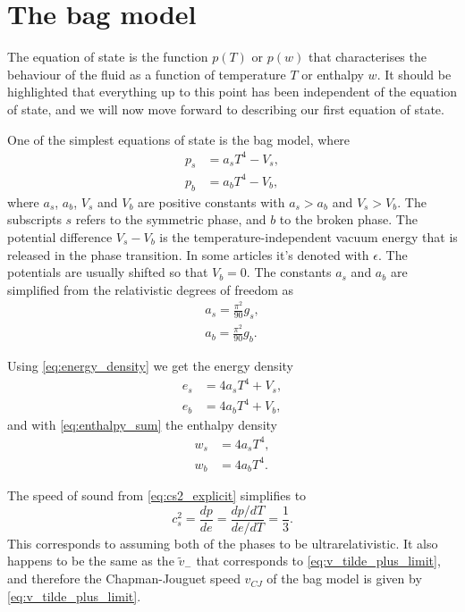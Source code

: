 \section{The bag model}
\label{bag_model}
The equation of state is the function $p(T)$ or $p(w)$ that characterises the behaviour of the fluid as a function of temperature $T$ or enthalpy $w$.
It should be highlighted that everything up to this point has been independent of the equation of state,
and we will now move forward to describing our first equation of state.

One of the simplest equations of state is the bag model, where
\cites[eq. 7.33]{lecture_notes}[eq. 8-9]{giese_2020}
\begin{align}
p_s &= a_s T^4 - V_s,
\label{eq:bag_ps} \\
p_b &= a_b T^4 - V_b,
\label{eq:bag_pb}
\end{align}
where $a_s$, $a_b$, $V_s$ and $V_b$ are positive constants with $a_s > a_b$ and $V_s > V_b$.
The subscripts $s$ refers to the symmetric phase, and $b$ to the broken phase.
The potential difference $V_s - V_b$ is the temperature-independent vacuum energy that is released in the phase transition.
In some articles it's denoted with $\epsilon$.
The potentials are usually shifted so that $V_b = 0$.
The constants $a_s$ and $a_b$ are simplified from the relativistic degrees of freedom as
\begin{align}
a_s = \frac{\pi^2}{90} g_s, \\
a_b = \frac{\pi^2}{90} g_b.
\end{align}

Using \eqref{eq:energy_density} we get the energy density
\begin{align}
e_s &= 4 a_s T^4 + V_s, \\
e_b &= 4 a_b T^4 + V_b,
\end{align}
and with \eqref{eq:enthalpy_sum} the enthalpy density
\begin{align}
w_s &= 4 a_s T^4, \\
w_b &= 4 a_b T^4.
\end{align}

The speed of sound from \eqref{eq:cs2_explicit} simplifies to
\begin{equation}
c_s^2 = \frac{dp}{de} = \frac{dp/dT}{de/dT} = \frac{1}{3}.
\end{equation}
This corresponds to assuming both of the phases to be ultrarelativistic.
It also happens to be the same as the $\tilde{v}_-$ that corresponds to \eqref{eq:v_tilde_plus_limit}, and therefore the Chapman-Jouguet speed $v_{CJ}$ of the bag model is given by \eqref{eq:v_tilde_plus_limit}.

